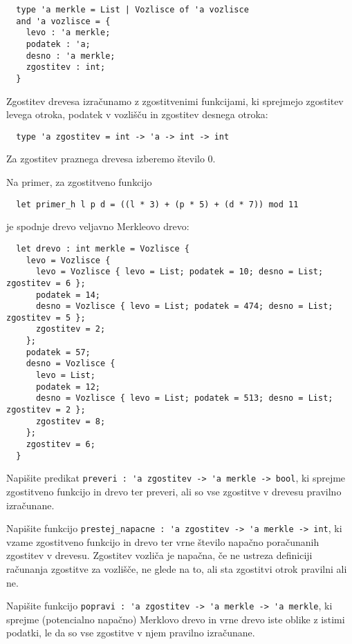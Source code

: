 \documentclass[arhiv]{../izpit}
\begin{document}
\begin{verbatim}
  type 'a merkle = List | Vozlisce of 'a vozlisce
  and 'a vozlisce = {
    levo : 'a merkle;
    podatek : 'a;
    desno : 'a merkle;
    zgostitev : int;
  }
\end{verbatim}

Zgostitev drevesa izračunamo z zgostitvenimi funkcijami, ki sprejmejo zgostitev levega otroka, podatek v vozlišču in zgostitev desnega otroka:
\begin{verbatim}
  type 'a zgostitev = int -> 'a -> int -> int
\end{verbatim}
Za zgostitev praznega drevesa izberemo število 0.

Na primer, za zgostitveno funkcijo
\begin{verbatim}
  let primer_h l p d = ((l * 3) + (p * 5) + (d * 7)) mod 11
\end{verbatim}
je spodnje drevo veljavno Merkleovo drevo:
\begin{verbatim}
  let drevo : int merkle = Vozlisce {
    levo = Vozlisce {
      levo = Vozlisce { levo = List; podatek = 10; desno = List; zgostitev = 6 };
      podatek = 14;
      desno = Vozlisce { levo = List; podatek = 474; desno = List; zgostitev = 5 };
      zgostitev = 2;
    };
    podatek = 57;
    desno = Vozlisce {
      levo = List;
      podatek = 12;
      desno = Vozlisce { levo = List; podatek = 513; desno = List; zgostitev = 2 };
      zgostitev = 8;
    };
    zgostitev = 6;
  }
\end{verbatim}

\podnaloga
  Napišite predikat \verb|preveri : 'a zgostitev -> 'a merkle -> bool|, ki sprejme zgostitveno funkcijo in drevo ter preveri, ali so vse zgostitve v drevesu pravilno izračunane.

\podnaloga
  Napišite funkcijo \verb|prestej_napacne : 'a zgostitev -> 'a merkle -> int|, ki vzame zgostitveno funkcijo in drevo ter vrne število napačno poračunanih zgostitev v drevesu. Zgostitev vozliča je napačna, če ne ustreza definiciji računanja zgostitve za vozlišče, ne glede na to, ali sta zgostitvi otrok pravilni ali ne.

\podnaloga
  Napišite funkcijo \verb|popravi : 'a zgostitev -> 'a merkle -> 'a merkle|, ki sprejme (potencialno napačno) Merklovo drevo in vrne drevo iste oblike z istimi podatki, le da so vse zgostitve v njem pravilno izračunane.


\naloga
\end{document}
